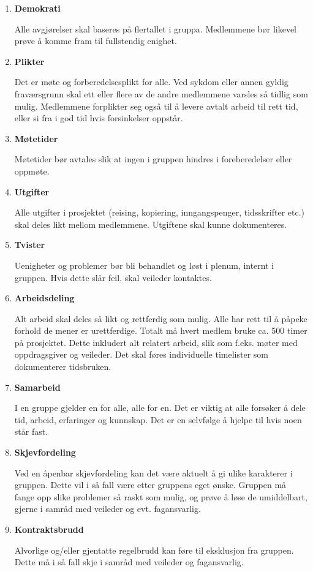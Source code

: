 \begin{large}
\begin{enumerate}
  \item \textbf{Demokrati}
  
Alle avgjørelser skal baseres på flertallet i gruppa. Medlemmene bør likevel prøve å komme fram til fullstendig enighet. 
  
  \item \textbf{Plikter}
  
Det er møte og forberedelsesplikt for alle. Ved sykdom eller annen gyldig fraværsgrunn skal ett eller flere av de andre medlemmene varsles så tidlig som mulig. Medlemmene forplikter seg også til å levere avtalt arbeid til rett tid, eller si fra i god tid hvis forsinkelser oppstår.

  \item \textbf{Møtetider}
  
Møtetider bør avtales slik at ingen i gruppen hindres i foreberedelser eller oppmøte.
  
  \item \textbf{Utgifter}
  
Alle utgifter i prosjektet (reising, kopiering, inngangspenger, tidsskrifter etc.) skal deles likt mellom medlemmene. Utgiftene skal kunne dokumenteres. 
  
  \item \textbf{Tvister}
  
Uenigheter og problemer bør bli behandlet og løst i plenum, internt i gruppen. Hvis dette slår feil, skal veileder kontaktes.

  
  \item \textbf{Arbeidsdeling}
  
Alt arbeid skal deles så likt og rettferdig som mulig. Alle har rett til å påpeke forhold de mener er urettferdige. Totalt må hvert medlem bruke ca. 500 timer på prosjektet. Dette inkludert alt relatert arbeid, slik som f.eks. møter med oppdragsgiver og veileder. Det skal føres individuelle timelister som dokumenterer tidsbruken.
  
  \item \textbf{Samarbeid}
  
I en gruppe gjelder en for alle, alle for en. Det er viktig at alle forsøker å dele tid, arbeid, erfaringer og kunnskap. Det er en selvfølge å hjelpe til hvis noen står fast.

  
  \item \textbf{Skjevfordeling}
  
Ved en åpenbar skjevfordeling kan det være aktuelt å gi ulike karakterer i gruppen. Dette vil i så fall være etter gruppens eget ønske. Gruppen må fange opp slike problemer så raskt som mulig, og prøve å løse de umiddelbart, gjerne i samråd med veileder og evt. fagansvarlig.

  \item \textbf{Kontraktsbrudd}
  
Alvorlige og/eller gjentatte regelbrudd kan føre til eksklusjon fra gruppen. Dette må i så fall skje i samråd med veileder og fagansvarlig. 

\end{enumerate}
  
\end{large} 

